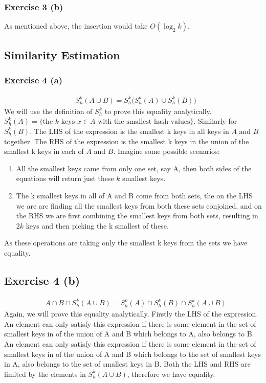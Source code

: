 \subsubsection{Exercise 3 (b)}
As mentioned above, the insertion would take \(O(\log_2 k)\).
\subsection{Similarity Estimation}

\subsubsection{Exercise 4 (a)}
\begin{align*}
&S_h^k(A \cup B) = S_h^k\big(S_h^k(A) \cup S_h^k(B)\big)
\end{align*}
We will use the definition of \(S_h^k \) to prove this equality analytically. \(S_h^k(A) = \{\text{the } k \text{ keys } x \in A \text{ with the smallest hash values}\} \). Similarly for \(S_h^k(B)\). The LHS of the expression is the smallest k keys in all keys in \(A\) and \(B\) together. The RHS of the expression is the smallest k keys in the union of the smallest k keys in each of \(A\) and \(B\).  Imagine some possible scenarios:
\begin{enumerate}
\item All the smallest keys came from only one set, say A, then both sides of the equations will return just these \(k\) smallest keys.  
\item The k smallest keys in all of A and B come from both sets, the on the LHS we are are finding all the smallest keys from both these sets conjoined, and on the RHS we are first combining the smallest keys from both sets, resulting in \(2k\) keys and then picking the k smallest of these.
\end{enumerate}
As these operations are taking only the smallest k keys from the sets we have equality.
\subsection{Exercise 4 (b)}
\begin{align*}
&A \cap B \cap S_h^k(A \cup B) = S_h^k(A) \cap S_h^k(B) \cap S_h^k(A \cup B)
\end{align*}
Again, we will prove this equality analytically. Firstly the LHS of the expression. An element can only satisfy this expression if there is some element in the set of smallest keys in of the union of A and B which belongs to A, also belongs to B. An element can only satisfy this expression if there is some element in the set of smallest keys in of the union of A and B which belongs to the set of smallest keys in A, also belongs to the set of smallest keys in B. Both the LHS and RHS are limited by the elements in \( S_h^k(A \cup B)\), therefore we have equality.

